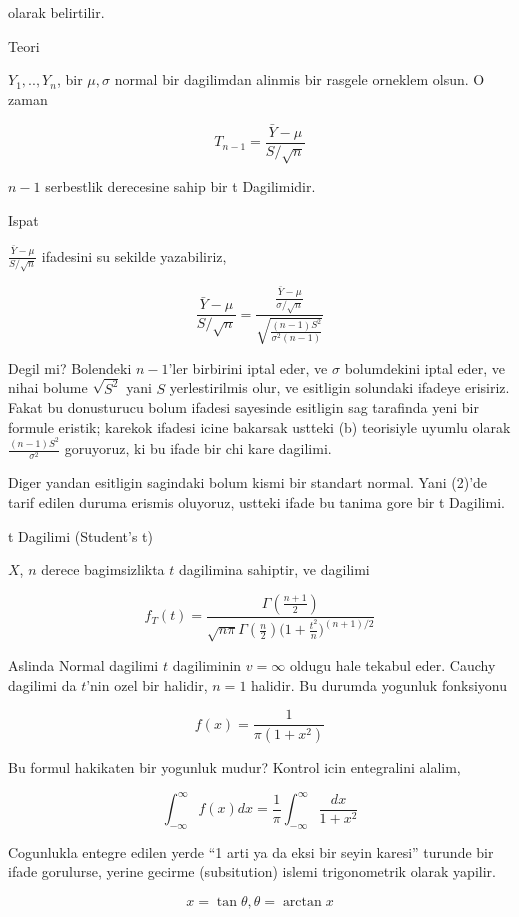 \documentclass[12pt,fleqn]{article}\usepackage{../common}
\begin{document}
olarak belirtilir.

Teori

$Y_1,..,Y_n$, bir $\mu,\sigma$ normal bir dagilimdan alinmis bir rasgele
orneklem olsun. O zaman 

$$ T_{n-1} = \frac{\bar{Y}-\mu}{S/\sqrt{n}}$$

$n-1$ serbestlik derecesine sahip bir t Dagilimidir. 

Ispat

$\frac{\bar{Y}-\mu}{S/\sqrt{n}}$ ifadesini su sekilde yazabiliriz, 

$$ \frac{\bar{Y}-\mu}{S/\sqrt{n}} =
\frac{\frac{\bar{Y}-\mu}{\sigma/\sqrt{n}} }
{\sqrt{\frac{(n-1)S^2}{\sigma^2(n-1)}}}
$$

Degil mi? Bolendeki $n-1$'ler birbirini iptal eder, ve $\sigma$ bolumdekini
iptal eder, ve nihai bolume $\sqrt{S^2}$ yani $S$ yerlestirilmis olur, ve
esitligin solundaki ifadeye erisiriz. Fakat bu donusturucu bolum ifadesi
sayesinde esitligin sag tarafinda yeni bir formule eristik; karekok ifadesi
icine bakarsak ustteki (b) teorisiyle uyumlu olarak
$\frac{(n-1)S^2}{\sigma^2}$ goruyoruz, ki bu ifade bir chi kare dagilimi.

Diger yandan esitligin sagindaki bolum kismi bir standart normal. Yani
(2)'de tarif edilen duruma erismis oluyoruz, ustteki ifade bu tanima gore
bir t Dagilimi. 


t Dagilimi (Student's t) 

$X$, $n$ derece bagimsizlikta $t$ dagilimina sahiptir, ve dagilimi

$$ 
f_T(t) = 
\frac
{
\Gamma(\frac{n+1}{2})
}
{
\sqrt{n\pi}\Gamma(\frac{n}{2})
\bigg(1+\frac{t^2}{n}\bigg)^{(n+1)/2}
}
 $$

Aslinda Normal dagilimi $t$ dagiliminin $v = \infty$ oldugu hale tekabul
eder. Cauchy dagilimi da $t$'nin ozel bir halidir, $n = 1$ halidir. Bu
durumda yogunluk fonksiyonu

$$ f(x)  = \frac{ 1}{\pi(1+ x^2)} $$

Bu formul hakikaten bir yogunluk mudur? Kontrol icin entegralini alalim, 

$$ \int _{ -\infty}^{\infty} f(x) dx = 
\frac{ 1}{\pi} \int _{ -\infty}^{\infty} \frac{ dx}{1 + x^2} 
 $$

Cogunlukla entegre edilen yerde  ``1 arti ya da eksi bir seyin karesi''
turunde  bir ifade gorulurse, yerine gecirme (subsitution) islemi
trigonometrik  olarak  yapilir. 

$$  x = \tan \theta, \theta = \arctan x $$
\end{document}
